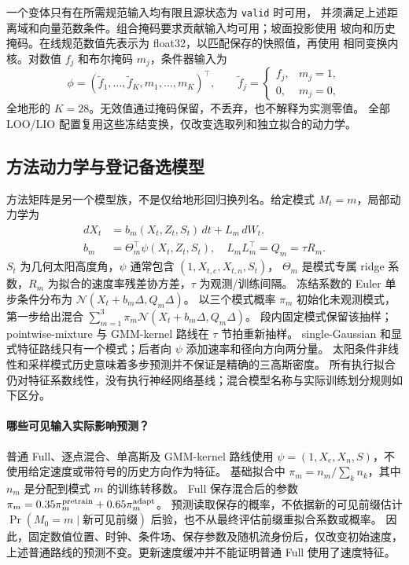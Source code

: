 \documentclass[UTF8,11pt]{ctexart}
\begin{document}
一个变体只有在所需规范输入均有限且源状态为 \texttt{valid} 时可用，
并须满足上述距离域和向量范数条件。组合掩码要求贡献输入均可用；坡面投影使用
坡向和历史掩码。在线规范数值先表示为 float32，以匹配保存的快照值，再使用
相同变换内核。对数值 \(f_j\) 和布尔掩码 \(m_j\)，条件器输入为
\begin{equation}
\phi=(\widetilde f_1,\ldots,\widetilde f_K,m_1,\ldots,m_K)^\top,
\qquad \widetilde f_j=
\begin{cases}f_j,&m_j=1,\\0,&m_j=0,\end{cases}
\label{eq:feature-masks}
\end{equation}
全地形的 \(K=28\)。无效值通过掩码保留，不丢弃，也不解释为实测零值。
全部 LOO/LIO 配置复用这些冻结变换，仅改变选取列和独立拟合的动力学。

\subsection{方法动力学与登记备选模型}
\label{sec:method-model}
方法矩阵是另一个模型族，不是仅给地形回归换列名。给定模式 \(M_t=m\)，局部动力学为
\begin{equation}
\begin{aligned}
dX_t&=b_m(X_t,Z_t,S_t)\,dt+L_m\,dW_t,\\
b_m&=\Theta_m^\top\psi(X_t,Z_t,S_t),\quad L_mL_m^\top=Q_m=\tau R_m.
\end{aligned}
\label{eq:method-sde}
\end{equation}
\(S_t\) 为几何太阳高度角，\(\psi\) 通常包含 \((1,X_{t,e},X_{t,n},S_t)\)，
\(\Theta_m\) 是模式专属 ridge 系数，\(R_m\) 为拟合的速度率残差协方差，\(\tau\) 为观测/训练间隔。
冻结系数的 Euler 单步条件分布为 \(\mathcal N(X_t+b_m\Delta,Q_m\Delta)\)。
以三个模式概率 \(\pi_m\) 初始化未观测模式，第一步给出混合
\(\sum_{m=1}^3\pi_m\mathcal N(X_t+b_m\Delta,Q_m\Delta)\)。
段内固定模式保留该抽样；pointwise-mixture 与 GMM-kernel 路线在 \(\tau\) 节拍重新抽样。
single-Gaussian 和显式特征路线只有一个模式；后者向 \(\psi\) 添加速率和径向方向两分量。
太阳条件非线性和采样模式历史意味着多步预测并不保证是精确的三高斯密度。
所有执行拟合仍对特征系数线性，没有执行神经网络基线；混合模型名称与实际训练划分规则如下区分。

\paragraph{哪些可见输入实际影响预测？}
普通 Full、逐点混合、单高斯及 GMM-kernel 路线使用
\(\psi=(1,X_e,X_n,S)\)，不使用给定速度或带符号的历史方向作为特征。
基础拟合中 \(\pi_m=n_m/\sum_k n_k\)，其中 \(n_m\) 是分配到模式 \(m\) 的训练转移数。
Full 保存混合后的参数
\(\pi_m=0.35\pi_m^{\rm pretrain}+0.65\pi_m^{\rm adapt}\)。
预测读取保存的概率，不依据新的可见前缀估计
\(\Pr(M_0=m\mid\text{新可见前缀})\) 后验，也不从最终评估前缀重拟合系数或概率。
因此，固定数值位置、时钟、条件场、保存参数及随机流身份后，仅改变初始速度，
上述普通路线的预测不变。更新速度缓冲并不能证明普通 Full 使用了速度特征。
\end{document}
